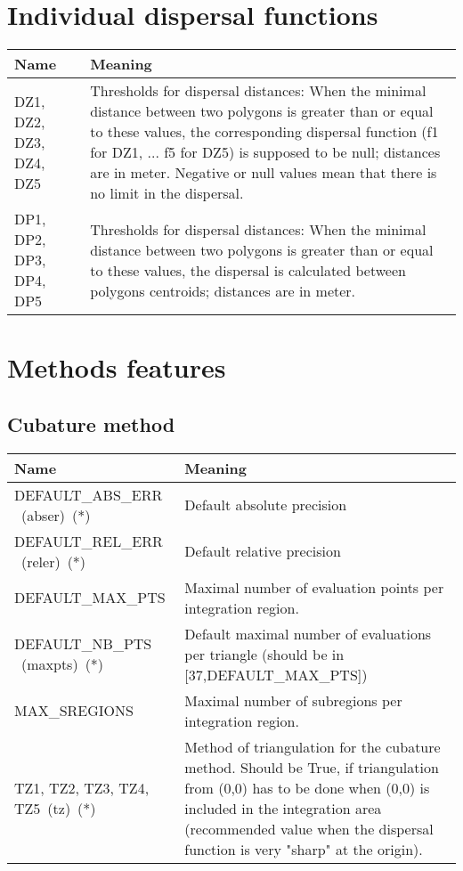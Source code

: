 \section{Individual dispersal functions}
\label{functions-constants}
\begin{tabular}[h]{|p{7cm}|p{7cm}|}
\hline
\textbf{Name} & \textbf{Meaning}  \\ \hline
DZ1, DZ2, DZ3, DZ4, DZ5
&
Thresholds for dispersal distances:
    When the minimal distance between two polygons
    is greater than
    or equal to
    these  values, the corresponding dispersal function 
(f1 for DZ1, ... f5 for DZ5) is
    supposed to be null; distances are in meter.
    Negative or null values mean that there is no limit
    in the dispersal.
\\ \hline
DP1, DP2, DP3, DP4, DP5
&
Thresholds for dispersal distances:
    When the minimal distance between two polygons is greater than
    or equal to
    these  values, the dispersal is calculated between
    polygons centroids;
    distances are in meter.
\\ \hline
\end{tabular}

\section{Methods features}
\subsection{Cubature method}

\begin{tabular}[h]{|p{5cm}|p{9cm}|}
\hline
\textbf{Name} & \textbf{Meaning}   \\ \hline
DEFAULT\_ABS\_ERR \mbox{ (abser)}\mbox{ (*)}
 & Default absolute precision
 \\ \hline
DEFAULT\_REL\_ERR \mbox{ (reler)}\mbox{ (*)}
 & Default relative precision
 \\ \hline
DEFAULT\_MAX\_PTS 
& Maximal number of evaluation points
per integration region.
 \\ \hline
DEFAULT\_NB\_PTS \mbox{ (maxpts)}\mbox{ (*)}
& Default maximal number of evaluations per triangle (should be in [37,DEFAULT\_MAX\_PTS])  
 \\ \hline
 MAX\_SREGIONS
& Maximal number of subregions per integration region.
 \\ \hline
TZ1, TZ2, TZ3, TZ4, TZ5\mbox{ (tz)}\mbox{ (*)}
&
Method of triangulation for the cubature method.
Should be True, if triangulation from (0,0) has to be done
when  (0,0) is included in the integration area
(recommended value when the dispersal function is very "sharp"
at the origin).
\\ \hline
\end{tabular}
